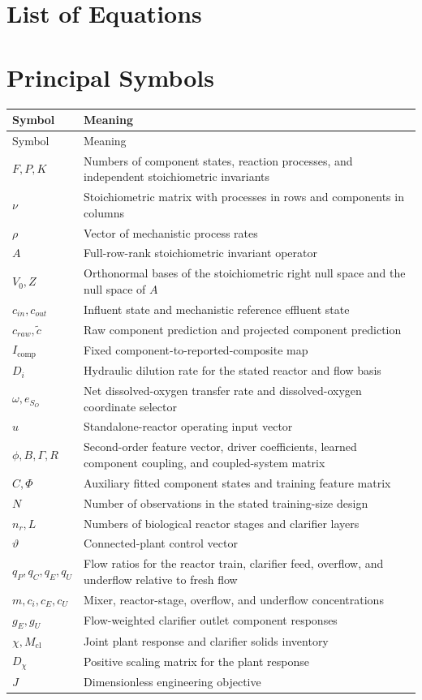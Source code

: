 \documentclass[12pt,twoside]{book}
\makeatletter
\newcommand{\listofequations}{%
    \chapter*{List of Equations}%
    \addcontentsline{toc}{chapter}{List of Equations}%
    \@starttoc{loe}%
}
\makeatother
\begin{document}
\cleardoublepage
\tableofcontents
\cleardoublepage
\listoffigures
\cleardoublepage
\listoftables

\cleardoublepage
\listofequations

\cleardoublepage
\chapter*{Principal Symbols}
\begin{longtable}{p{}p{}}
\toprule
Symbol & Meaning \\
\midrule
\endfirsthead
\toprule Symbol & Meaning \\
\midrule
\endhead
$F,P,K$ & Numbers of component states, reaction processes, and independent stoichiometric invariants \\
$\nu$ & Stoichiometric matrix with processes in rows and components in columns \\
$\rho$ & Vector of mechanistic process rates \\
$A$ & Full-row-rank stoichiometric invariant operator \\
$V_0,Z$ & Orthonormal bases of the stoichiometric right null space and the null space of $A$ \\
$c_{in},c_{out}$ & Influent state and mechanistic reference effluent state \\
$c_{raw},\widetilde c$ & Raw component prediction and projected component prediction \\
$I_{\mathrm{comp}}$ & Fixed component-to-reported-composite map \\
$D_i$ & Hydraulic dilution rate for the stated reactor and flow basis \\
$\omega,e_{S_O}$ & Net dissolved-oxygen transfer rate and dissolved-oxygen coordinate selector \\
$u$ & Standalone-reactor operating input vector \\
$\phi,B,\Gamma,R$ & Second-order feature vector, driver coefficients, learned component coupling, and coupled-system matrix \\
$\widehat C,\Phi$ & Auxiliary fitted component states and training feature matrix \\
$N$ & Number of observations in the stated training-size design \\
$n_r,L$ & Numbers of biological reactor stages and clarifier layers \\
$\vartheta$ & Connected-plant control vector \\
$q_P,q_C,q_E,q_U$ & Flow ratios for the reactor train, clarifier feed, overflow, and underflow relative to fresh flow \\
$m,c_i,c_E,c_U$ & Mixer, reactor-stage, overflow, and underflow concentrations \\
$g_E,g_U$ & Flow-weighted clarifier outlet component responses \\
$\chi,M_{\mathrm{cl}}$ & Joint plant response and clarifier solids inventory \\
$D_\chi$ & Positive scaling matrix for the plant response \\
$J$ & Dimensionless engineering objective \\
\bottomrule
\end{longtable}
\end{document}
